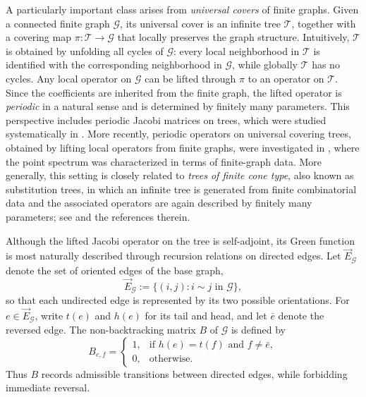 \documentclass[11pt,twoside, a4paper]{article}
\numberwithin{equation}{section}
\numberwithin{figure}{section}
\theoremstyle{plain} %
\theoremstyle{definition}
\theoremstyle{remark}
\newcommand{\1} {\mspace{1 mu}}
\newcommand{\2} {\mspace{2 mu}}
\begin{document}
A particularly important class arises from \emph{universal covers} of
finite graphs. Given a connected finite graph \(\mathcal G\), its universal
cover is an infinite tree \(\mathcal T\), together with a covering map
\(\pi:\mathcal T\to\mathcal G\) that locally preserves the graph structure.
Intuitively, \(\mathcal T\) is obtained by unfolding all cycles of
\(\mathcal G\): every local neighborhood in \(\mathcal T\) is identified
with the corresponding neighborhood in \(\mathcal G\), while globally
\(\mathcal T\) has no cycles. Any local operator on \(\mathcal G\) can be
lifted through \(\pi\) to an operator on \(\mathcal T\). Since the
coefficients are inherited from the finite graph, the lifted operator is
\emph{periodic} in a natural sense and is determined by finitely many parameters.
This perspective includes periodic Jacobi matrices on trees, which were
studied systematically in \cite{AvniBreuerSimon2020}. More recently,
periodic operators on universal covering trees, obtained by lifting local
operators from finite graphs, were investigated in
\cite{BanksGarzaVargasMukherjee2022}, where the point spectrum was
characterized in terms of finite-graph data. More generally, this setting
is closely related to \emph{trees of finite cone type}, also known as
substitution trees, in which an infinite tree is generated from finite
combinatorial data and the associated operators are again described by
finitely many parameters; see
\cite{KellerLenzWarzel2013,KellerLenzWarzel2014,random2002nagnibeda,Sadel2013} and the
references therein.

Although the lifted Jacobi operator on the tree is self-adjoint, its Green
function is most naturally described through recursion relations on
directed edges. Let \(\vec E_{\mathcal G}\) denote the set of oriented
edges of the base graph,
\[
    \vec E_{\mathcal G}
    :=
    \{(i,j): i\sim j \text{ in } \mathcal G\},
\]
so that each undirected edge is represented by its two possible
orientations. For \(e\in \vec E_{\mathcal G}\), write \(t(e)\) and
\(h(e)\) for its tail and head, and let \(\bar e\) denote the reversed
edge. The non-backtracking matrix \( B\) of \(\mathcal G\) is
defined by
\[
   B_{e,f}
    =
    \begin{cases}
    1, & \text{if } h(e)=t(f) \text{ and } f\neq \bar e,\\
    0, & \text{otherwise}.
    \end{cases}
\]
Thus \( B\) records admissible transitions between directed edges,
while forbidding immediate reversal.
\end{document}
